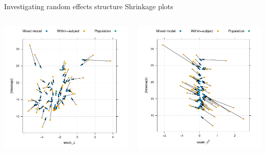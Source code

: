 \documentclass[aspectratio=169]{beamer}
\begin{document}
\begin{frame}[fragile]{Investigating random effects structure}
  {Shrinkage plots}
  \begin{columns}
    \begin{column}{.35\textwidth}
      \includegraphics[scale=.35]{../figures/hdrs_shrinkage_int-week}
    \end{column}
    \begin{column}{.35\textwidth}
      \includegraphics[scale=.35]{../figures/hdrs_shrinkage_int-weeksq}

\end{column}
\end{columns}
\end{frame}
\end{document}
